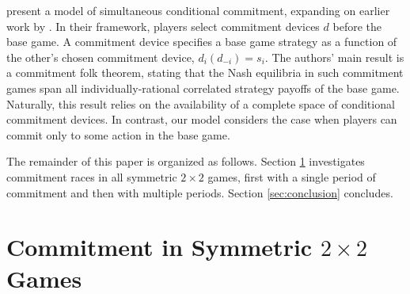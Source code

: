 \documentclass[letterpaper]{article}
\theoremstyle{definition}
\begin{document}
\citet{kalai_commitment_2010} present a model of simultaneous conditional commitment, expanding on earlier work by \citet{tennenholtz_program_2004}. In their framework, players select commitment devices $d$ before the base game. A commitment device specifies a base game strategy as a function of the other's chosen commitment device, $d_i(d_{-i}) = s_i$. The authors' main result is a commitment folk theorem, stating that the Nash equilibria in such commitment games span all individually-rational correlated strategy payoffs of the base game. Naturally, this result relies on the availability of a complete space of conditional commitment devices. In contrast, our model considers the case when players can commit only to some action in the base game. 


The remainder of this paper is organized as follows. Section \ref{sec:commitment-in-symmetric-2x2-games} investigates commitment races in all symmetric $2\times2$ games, first with a single period of commitment and then with multiple periods. Section \ref{sec:conclusion} concludes.


\section{Commitment in Symmetric $2\times2$ Games}\label{sec:commitment-in-symmetric-2x2-games}

\end{document}
